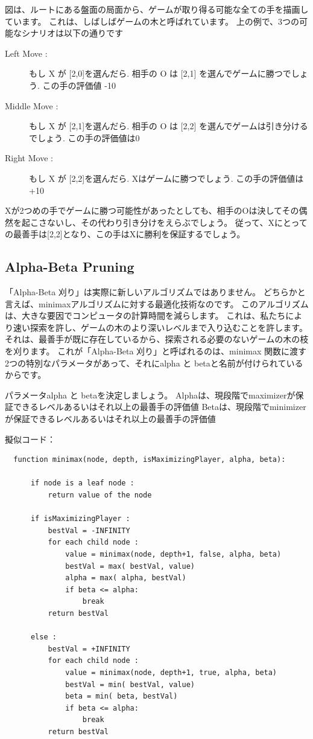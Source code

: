 \documentclass[uplatex,a4paper,11pt,oneside,openany]{jsbook}
\begin{document}
図は、ルートにある盤面の局面から、ゲームが取り得る可能な全ての手を描画しています。
これは、しばしばゲームの木と呼ばれています。
上の例で、3つの可能なシナリオは以下の通りです

\begin{description}
\item[Left Move :] もし X が [2,0]を選んだら. 相手の O は [2,1] を選んでゲームに勝つでしょう. この手の評価値 -10
\item[Middle Move :] もし X が [2,1]を選んだら. 相手の O は [2,2] を選んでゲームは引き分けるでしょう. この手の評価値は0
\item[Right Move :] もし X が [2,2]を選んだら. Xはゲームに勝つでしょう. この手の評価値は+10
\end{description}

Xが2つめの手でゲームに勝つ可能性があったとしても、相手のOは決してその偶然を起こさないし、その代わり引き分けをえらぶでしょう。
従って、Xにとっての最善手は[2,2]となり、この手はXに勝利を保証するでしょう。

\subsection{Alpha-Beta Pruning}

「Alpha-Beta 刈り」は実際に新しいアルゴリズムではありません。
どちらかと言えば、minimaxアルゴリズムに対する最適化技術なのです。
このアルゴリズムは、大きな要因でコンピュータの計算時間を減らします。
これは、私たちにより速い探索を許し、ゲームの木のより深いレベルまで入り込むことを許します。
それは、最善手が既に存在しているから、探索される必要のないゲームの木の枝を刈ります。
これが「Alpha-Beta 刈り」と呼ばれるのは、minimax 関数に渡す2つの特別なパラメータがあって、それにalpha と betaと名前が付けられているからです。

パラメータalpha と betaを決定しましょう。
Alphaは、現段階でmaximizerが保証できるレベルあるいはそれ以上の最善手の評価値
Betaは、現段階でminimizerが保証できるレベルあるいはそれ以上の最善手の評価値

擬似コード：

\begin{verbatim}
  function minimax(node, depth, isMaximizingPlayer, alpha, beta):

      if node is a leaf node :
          return value of the node

      if isMaximizingPlayer :
          bestVal = -INFINITY
          for each child node :
              value = minimax(node, depth+1, false, alpha, beta)
              bestVal = max( bestVal, value)
              alpha = max( alpha, bestVal)
              if beta <= alpha:
                  break
          return bestVal

      else :
          bestVal = +INFINITY
          for each child node :
              value = minimax(node, depth+1, true, alpha, beta)
              bestVal = min( bestVal, value)
              beta = min( beta, bestVal)
              if beta <= alpha:
                  break
          return bestVal
\end{verbatim}
\end{document}
